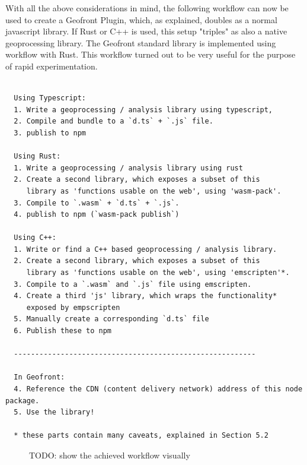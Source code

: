With all the above considerations in mind, the following workflow can now be used to create a Geofront Plugin, which, as explained, doubles as a normal javascript library. 
If Rust or C++ is used, this setup "triples" as also a native geoprocessing library.
The Geofront standard library is implemented using workflow with Rust.
This workflow turned out to be very useful for the purpose of rapid experimentation. 

\begin{lstlisting}
  
  Using Typescript: 
  1. Write a geoprocessing / analysis library using typescript, 
  2. Compile and bundle to a `d.ts` + `.js` file.
  3. publish to npm 

  Using Rust: 
  1. Write a geoprocessing / analysis library using rust
  2. Create a second library, which exposes a subset of this 
     library as 'functions usable on the web', using 'wasm-pack'.
  3. Compile to `.wasm` + `d.ts` + `.js`.
  4. publish to npm (`wasm-pack publish`)
  
  Using C++: 
  1. Write or find a C++ based geoprocessing / analysis library. 
  2. Create a second library, which exposes a subset of this 
     library as 'functions usable on the web', using 'emscripten'*.
  3. Compile to a `.wasm` and `.js` file using emscripten.
  4. Create a third 'js' library, which wraps the functionality* 
     exposed by empscripten
  5. Manually create a corresponding `d.ts` file
  6. Publish these to npm 

  ---------------------------------------------------------

  In Geofront: 
  4. Reference the CDN (content delivery network) address of this node package. 
  5. Use the library!

  * these parts contain many caveats, explained in Section 5.2

\end{lstlisting}

\begin{figure}
  \centering
  \graphicspath{ {../../assets/diagrams/} }
  \caption[]{TODO: show the achieved workflow visually}
  \label{fig:todo-more-images}
\end{figure}



